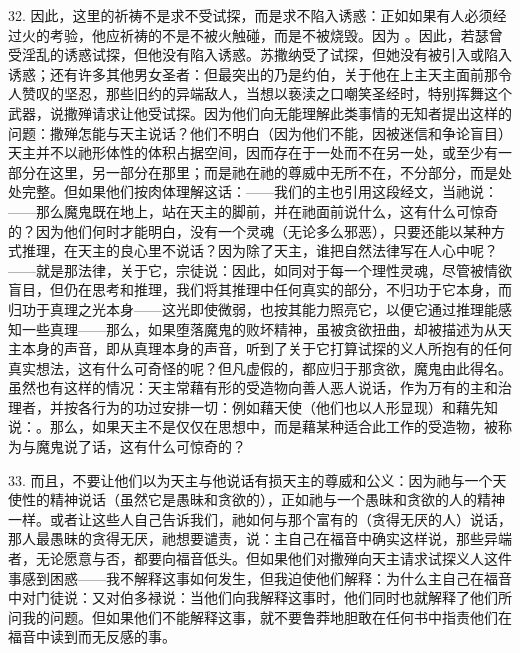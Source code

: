 32. 因此，这里的祈祷不是求不受试探，而是求不陷入诱惑：正如如果有人必须经过火的考验，他应祈祷的不是不被火触碰，而是不被烧毁。因为 。因此，若瑟曾受淫乱的诱惑试探，但他没有陷入诱惑。苏撒纳受了试探，但她没有被引入或陷入诱惑；还有许多其他男女圣者：但最突出的乃是约伯，关于他在上主天主面前那令人赞叹的坚忍，那些旧约的异端敌人，当想以亵渎之口嘲笑圣经时，特别挥舞这个武器，说撒殚请求让他受试探。因为他们向无能理解此类事情的无知者提出这样的问题：撒殚怎能与天主说话？他们不明白（因为他们不能，因被迷信和争论盲目）天主并不以祂形体性的体积占据空间，因而存在于一处而不在另一处，或至少有一部分在这里，另一部分在那里；而是祂在祂的尊威中无所不在，不分部分，而是处处完整。但如果他们按肉体理解这话：——我们的主也引用这段经文，当祂说：——那么魔鬼既在地上，站在天主的脚前，并在祂面前说什么，这有什么可惊奇的？因为他们何时才能明白，没有一个灵魂（无论多么邪恶），只要还能以某种方式推理，在天主的良心里不说话？因为除了天主，谁把自然法律写在人心中呢？——就是那法律，关于它，宗徒说：因此，如同对于每一个理性灵魂，尽管被情欲盲目，但仍在思考和推理，我们将其推理中任何真实的部分，不归功于它本身，而归功于真理之光本身——这光即使微弱，也按其能力照亮它，以便它通过推理能感知一些真理——那么，如果堕落魔鬼的败坏精神，虽被贪欲扭曲，却被描述为从天主本身的声音，即从真理本身的声音，听到了关于它打算试探的义人所抱有的任何真实想法，这有什么可奇怪的呢？但凡虚假的，都应归于那贪欲，魔鬼由此得名。虽然也有这样的情况：天主常藉有形的受造物向善人恶人说话，作为万有的主和治理者，并按各行为的功过安排一切：例如藉天使（他们也以人形显现）和藉先知说：。那么，如果天主不是仅仅在思想中，而是藉某种适合此工作的受造物，被称为与魔鬼说了话，这有什么可惊奇的？\par

33. 而且，不要让他们以为天主与他说话有损天主的尊威和公义：因为祂与一个天使性的精神说话（虽然它是愚昧和贪欲的），正如祂与一个愚昧和贪欲的人的精神一样。或者让这些人自己告诉我们，祂如何与那个富有的（贪得无厌的人）说话，那人最愚昧的贪得无厌，祂想要谴责，说：主自己在福音中确实这样说，那些异端者，无论愿意与否，都要向福音低头。但如果他们对撒殚向天主请求试探义人这件事感到困惑——我不解释这事如何发生，但我迫使他们解释：为什么主自己在福音中对门徒说：又对伯多禄说：当他们向我解释这事时，他们同时也就解释了他们所问我的问题。但如果他们不能解释这事，就不要鲁莽地胆敢在任何书中指责他们在福音中读到而无反感的事。\par


